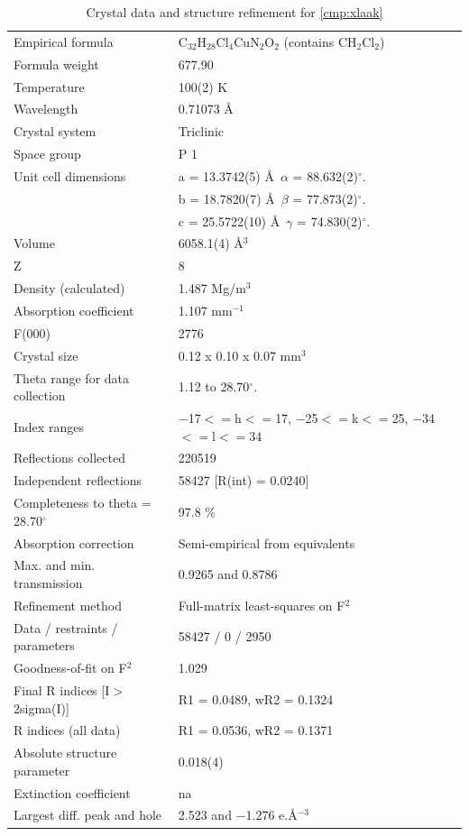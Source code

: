 \begin{table}[h]
\centering
\caption{Crystal data and structure refinement for \ref{cmp:xlaak}} 
\begin{tabular}{ll} 
\toprule
Empirical formula& 	C$_{32}$H$_{28}$Cl$_4$CuN$_2$O$_2$ (contains CH$_2$Cl$_2$)\\ 
Formula weight&	677.90 \\
Temperature &	100(2) K \\
Wavelength& 	0.71073 \AA  \\
Crystal system& 	Triclinic\\
Space group& 	P 1 \\
Unit cell dimensions&	a = 13.3742(5) \AA\ 	$\alpha$ = 88.632(2)$^\circ$. \\
	&b = 18.7820(7) \AA\ 	$\beta$ = 77.873(2)$^\circ$. \\
	&c = 25.5722(10) \AA\ 	$\gamma$ = 74.830(2)$^\circ$. \\
Volume&	6058.1(4) \AA$^3$ \\
Z&	8 \\
Density (calculated)&	1.487 Mg/m$^3$ \\
Absorption coefficient&	1.107 mm$^{-1}$ \\
F(000) &	2776 \\
Crystal size &	0.12 x 0.10 x 0.07 mm$^3$ \\
Theta range for data collection &	1.12 to 28.70$^\circ$. \\
Index ranges &	$-$17$<=$h$<=$17, $-$25$<=$k$<=$25, $-$34$<=$l$<=$34 \\
Reflections collected &	220519 \\
Independent reflections &	58427 [R(int) = 0.0240] \\
Completeness to theta = 28.70$^\circ$ &	97.8 \% \\ 
Absorption correction&	Semi-empirical from equivalents \\
Max. and min. transmission &	0.9265 and 0.8786 \\
Refinement method	&Full-matrix least-squares on F$^2$ \\
Data / restraints / parameters &	 58427 / 0 / 2950 \\
Goodness-of-fit on F$^2$ & 	1.029 \\
Final R indices [I$>$2sigma(I)] &	R1 = 0.0489, wR2 = 0.1324 \\
R indices (all data) &	R1 = 0.0536, wR2 = 0.1371 \\
Absolute structure parameter &	0.018(4) \\
Extinction coefficient	& na \\
Largest diff. peak and hole &	2.523 and $-$1.276 e.\AA$^{-3}$ \\
\bottomrule
\end{tabular}
\end{table}
\pagebreak


